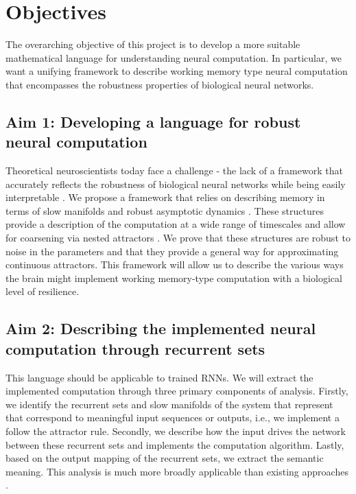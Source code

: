 \documentclass[12pt,letterpaper, onecolumn]{article}
\theoremstyle{definition}
\theoremstyle{remark}
\begin{document}
%


\newpage
\section{Objectives}
The overarching objective of this project is to develop a more suitable mathematical language for understanding neural computation. In particular, we want a unifying framework to describe working memory type neural computation that encompasses the robustness properties of biological neural networks.

\subsection*{Aim 1: Developing a language for robust neural computation}
Theoretical neuroscientists today face a challenge - the lack of a  framework that accurately reflects the robustness of biological neural networks while being easily interpretable \citep{lillicrap2019}.
We propose a framework that relies on describing memory in terms of slow manifolds \citep{ghazizadeh2021slow} and robust asymptotic dynamics \citep{casey1996}.
These structures provide a description of the computation at a wide range of timescales \citep{jaeger2023timescales} and allow for coarsening via nested attractors \citep{braun2010}.
We prove that these structures are robust to noise in the parameters \citep{Park2023a} and that they provide a general way for approximating continuous attractors.
This framework will allow us to describe the various ways the brain might implement working memory-type computation with a biological level of resilience.


\subsection*{Aim 2: Describing the implemented neural computation through recurrent sets}
This language should be applicable to trained RNNs. We will extract the implemented computation through three primary components of analysis. Firstly, we identify the recurrent sets and slow manifolds of the system that represent that correspond to meaningful input sequences or outputs, i.e., we implement a follow the attractor rule. Secondly, we describe how the input drives the network between these recurrent sets and implements the computation algorithm. Lastly, based on the output mapping of the recurrent sets, we extract the semantic meaning.
This analysis is much more broadly applicable than existing approaches \citep{sussillo2013blackbox, sussillo2014, beer2018, maheswaranathan2019universality, driscoll2022, mante2013context, turner2021charting, turner2023, casey1996, valente2022extracting}.
\end{document}
